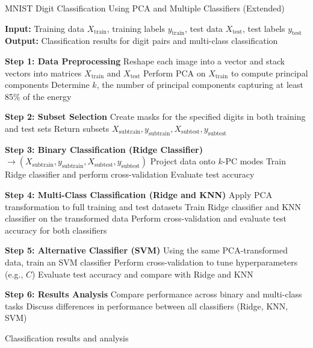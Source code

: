 \documentclass[11pt]{amsart}
\begin{document}
\begin{algorithm}[H]
    \caption{MNIST Digit Classification Using PCA and Multiple Classifiers (Extended)}
    \label{alg:mnist_classification_extended}
    \begin{algorithmic}[1]
    \State \textbf{Input:} Training data $X_{\text{train}}$, training labels $y_{\text{train}}$, test data $X_{\text{test}}$, test labels $y_{\text{test}}$
    \State \textbf{Output:} Classification results for digit pairs and multi-class classification
    
    \State \textbf{Step 1: Data Preprocessing}
    \State Reshape each image into a vector and stack vectors into matrices $X_{\text{train}}$ and $X_{\text{test}}$
    \State Perform PCA on $X_{\text{train}}$ to compute principal components
    \State Determine $k$, the number of principal components capturing at least 85\% of the energy
    
    \State \textbf{Step 2: Subset Selection}
        \State Create masks for the specified digits in both training and test sets
        \State Return subsets $X_{\text{subtrain}}, y_{\text{subtrain}}, X_{\text{subtest}}, y_{\text{subtest}}$
    \EndFunction
    
    \State \textbf{Step 3: Binary Classification (Ridge Classifier)}
        \State {} $\rightarrow (X_{\text{subtrain}}, y_{\text{subtrain}}, X_{\text{subtest}}, y_{\text{subtest}})$
        \State Project data onto $k$-PC modes
        \State Train Ridge classifier and perform cross-validation
        \State Evaluate test accuracy
    \EndFor
    
    \State \textbf{Step 4: Multi-Class Classification (Ridge and KNN)}
    \State Apply PCA transformation to full training and test datasets
    \State Train Ridge classifier and KNN classifier on the transformed data
    \State Perform cross-validation and evaluate test accuracy for both classifiers
    
    \State \textbf{Step 5: Alternative Classifier (SVM)}
    \State Using the same PCA-transformed data, train an SVM classifier
    \State Perform cross-validation to tune hyperparameters (e.g., $C$)
    \State Evaluate test accuracy and compare with Ridge and KNN
    
    \State \textbf{Step 6: Results Analysis}
    \State Compare performance across binary and multi-class tasks
    \State Discuss differences in performance between all classifiers (Ridge, KNN, SVM)
    
    \State \Return Classification results and analysis
    \end{algorithmic}
\end{algorithm}
\end{document}
